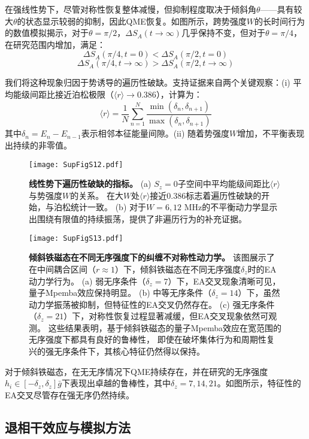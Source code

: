 \documentclass[11pt,a4paper]{article}
\begin{document}
在强线性势下，尽管对称性恢复整体减慢，但抑制程度取决于倾斜角$\theta$——具有较大$\theta$的状态显示较弱的抑制，因此QME恢复。如图所示，跨势强度$W$的长时间行为的数值模拟揭示，对于$\theta=\pi/2$，$\Delta S_A(t\rightarrow\infty)$几乎保持不变，但对于$\theta=\pi/4$，在研究范围内增加，满足：
\[
\Delta S_A(\pi/4,t=0) < \Delta S_A(\pi/2,t=0)
\]
\[
\Delta S_A(\pi/4,t\rightarrow\infty) > \Delta S_A(\pi/2,t\rightarrow\infty)
\]

我们将这种现象归因于势诱导的遍历性破缺。支持证据来自两个关键观察：(i) 平均能级间距比接近泊松极限（$\langle r\rangle \rightarrow 0.386$），计算为：
\[
\langle r\rangle = \frac{1}{N}\sum_{n=1}^{N} \frac{\min(\delta_n,\delta_{n+1})}{\max(\delta_n,\delta_{n+1})}
\]
其中$\delta_n=E_n-E_{n-1}$表示相邻本征能量间隙。(ii) 随着势强度$W$增加，不平衡表现出持续的非零值。

\begin{figure}[H]
    \centering
    \texttt{[image: SupFigS12.pdf]}
    \caption{
        \textbf{线性势下遍历性破缺的指标。}
        (a) $S_z=0$子空间中平均能级间距比$\langle r\rangle$与势强度$W$的关系。
        在大$W$处$\langle r\rangle$接近$0.386$标志着遍历性破缺的开始，与泊松统计一致。
        (b) 对于$W=6,12$ MHz的不平衡动力学显示出围绕有限值的持续振荡，提供了非遍历行为的补充证据。
    }
    \label{fig:ergodicity_breaking}
\end{figure}

\begin{figure}[H]
    \centering
    \texttt{[image: SupFigS13.pdf]}
    \caption{
        \textbf{倾斜铁磁态在不同无序强度下的纠缠不对称性动力学。}
        该图展示了在中间耦合区间（$r \approx 1$）下，倾斜铁磁态在不同无序强度$\delta_z$时的EA动力学行为。
        (a) 弱无序条件（$\delta_z = 7$）下，EA交叉现象清晰可见，量子Mpemba效应保持明显。
        (b) 中等无序条件（$\delta_z = 14$）下，虽然动力学振荡被抑制，但特征性的EA交叉仍然存在。
        (c) 强无序条件（$\delta_z = 21$）下，对称性恢复过程显著减缓，但EA交叉现象依然可观测。
        这些结果表明，基于倾斜铁磁态的量子Mpemba效应在宽范围的无序强度下都具有良好的鲁棒性，
        即使在破坏集体行为和周期性复兴的强无序条件下，其核心特征仍然得以保持。
    }
    \label{fig:disorder_strength_EA}
\end{figure}

对于倾斜铁磁态，在无无序情况下QME持续存在，并在研究的无序强度$h_i\in[-\delta_z,\delta_z]\bar{g}$下表现出卓越的鲁棒性，其中$\delta_z=7,14,21$。如图所示，特征性的EA交叉尽管存在强无序仍然持续。

\subsection{退相干效应与模拟方法}
\end{document}
